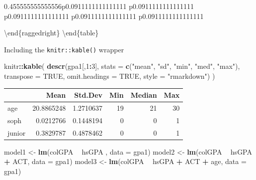\documentclass[]{book}
\newenvironment{Shaded}{\begin{snugshade}}{\end{snugshade}}
\newcommand{\DataTypeTok}[1]{\textcolor[rgb]{0.13,0.29,0.53}{#1}}
\newcommand{\DecValTok}[1]{\textcolor[rgb]{0.00,0.00,0.81}{#1}}
\newcommand{\KeywordTok}[1]{\textcolor[rgb]{0.13,0.29,0.53}{\textbf{#1}}}
\newcommand{\NormalTok}[1]{#1}
\newcommand{\OperatorTok}[1]{\textcolor[rgb]{0.81,0.36,0.00}{\textbf{#1}}}
\newcommand{\OtherTok}[1]{\textcolor[rgb]{0.56,0.35,0.01}{#1}}
\newcommand{\StringTok}[1]{\textcolor[rgb]{0.31,0.60,0.02}{#1}}
\begin{document}
\providecommand{\huxb}[2][0,0,0]{\arrayrulecolor[RGB]{#1}\global\arrayrulewidth=#2pt}
    \providecommand{\huxvb}[2][0,0,0]{\color[RGB]{#1}\vrule width #2pt}
    \providecommand{\huxtpad}[1]{\rule{0pt}{\baselineskip+#1}}
    \providecommand{\huxbpad}[1]{\rule[-#1]{0pt}{#1}}
  \begin{tabularx}{0.455555555555556\textwidth}{p{} p{} p{} p{} p{}}


\par

\textbackslash{}end\{raggedright\} \textbackslash{}end\{table\}

Including the \texttt{knitr::kable()} wrapper

\begin{Shaded}
\begin{Highlighting}[]
\NormalTok{knitr}\OperatorTok{::}\KeywordTok{kable}\NormalTok{(}
  \KeywordTok{descr}\NormalTok{(gpa1[,}\DecValTok{1}\OperatorTok{:}\DecValTok{3}\NormalTok{], }\DataTypeTok{stats =} \KeywordTok{c}\NormalTok{(}\StringTok{"mean"}\NormalTok{, }\StringTok{"sd"}\NormalTok{, }\StringTok{"min"}\NormalTok{, }\StringTok{"med"}\NormalTok{, }\StringTok{"max"}\NormalTok{), }\DataTypeTok{transpose =} \OtherTok{TRUE}\NormalTok{, }
        \DataTypeTok{omit.headings =} \OtherTok{TRUE}\NormalTok{, }\DataTypeTok{style =} \StringTok{"rmarkdown"}\NormalTok{)}
\NormalTok{)}
\end{Highlighting}
\end{Shaded}

\begin{tabular}{l|r|r|r|r|r}
\hline
  & Mean & Std.Dev & Min & Median & Max\\
\hline
age & 20.8865248 & 1.2710637 & 19 & 21 & 30\\
\hline
soph & 0.0212766 & 0.1448194 & 0 & 0 & 1\\
\hline
junior & 0.3829787 & 0.4878462 & 0 & 0 & 1\\
\hline
\end{tabular}

\begin{Shaded}
\begin{Highlighting}[]
\NormalTok{model1 <-}\StringTok{ }\KeywordTok{lm}\NormalTok{(colGPA }\OperatorTok{~}\StringTok{ }\NormalTok{hsGPA , }\DataTypeTok{data =}\NormalTok{ gpa1)}
\NormalTok{model2 <-}\StringTok{ }\KeywordTok{lm}\NormalTok{(colGPA }\OperatorTok{~}\StringTok{ }\NormalTok{hsGPA }\OperatorTok{+}\StringTok{ }\NormalTok{ACT, }\DataTypeTok{data =}\NormalTok{ gpa1)}
\NormalTok{model3 <-}\StringTok{ }\KeywordTok{lm}\NormalTok{(colGPA }\OperatorTok{~}\StringTok{ }\NormalTok{hsGPA }\OperatorTok{+}\StringTok{ }\NormalTok{ACT }\OperatorTok{+}\StringTok{ }\NormalTok{age, }\DataTypeTok{data =}\NormalTok{ gpa1)}
\end{Highlighting}
\end{Shaded}


\end{tabularx}
\end{document}
